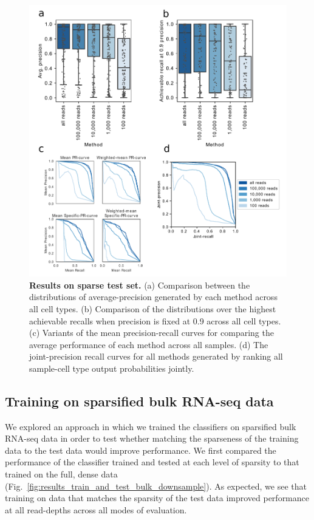  \begin{figure}[h!]
      \centerline{\includegraphics[width=13cm]{figures/bulk_test_set_downsampled_results.pdf}}
      \caption{\textbf{Results on sparse test set.} (a) Comparison between the distributions of average-precision generated by each method across all cell types.  (b) Comparison of the distributions over the highest achievable recalls when precision is fixed at 0.9 across all cell types. (c) Variants of the mean precision-recall curves for comparing the average performance of each method across all samples. (d) The joint-precision recall curves for all methods generated by ranking all sample-cell type output probabilities jointly.}
      \label{fig:results_test_bulk_downsample}
      \end{figure}

\subsection{Training on sparsified bulk RNA-seq data}\label{sec:sparse_test}

We explored an approach in which we trained the classifiers on sparsified bulk RNA-seq data in order to test whether matching the sparseness of the training data to the test data would improve performance. We first  compared the performance of the classifier trained and tested at each level of sparsity to that trained on the full, dense data (Fig.~\ref{fig:results_train_and_test_bulk_downsample}). As expected, we see that training on data that matches the sparsity of the test data improved performance at all read-depths across all modes of evaluation.


